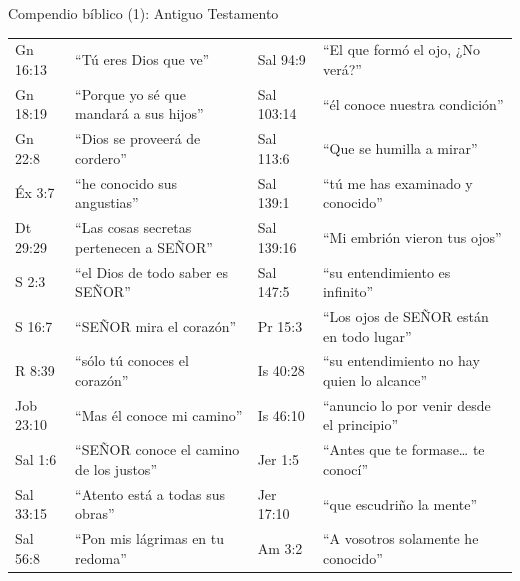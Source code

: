 \documentclass[hyperref={bookmarks=false},aspectratio=169]{beamer}
\newcommand{\SENOR}{S{\fontsize{0.78em}{1em}\selectfont EÑOR}}
\begin{document}
\begin{frame}{Compendio bíblico (1): Antiguo Testamento}
\fontsize{6.2}{7.4}\selectfont\renewcommand{\arraystretch}{1.06}
\begin{tabular}{@{}>{\RaggedRight\arraybackslash}p{1.6cm}>{\RaggedRight\arraybackslash}p{4.3cm}|>{\RaggedRight\arraybackslash}p{1.6cm}>{\RaggedRight\arraybackslash}p{4.3cm}@{}}
\toprule
Gn 16:13 & ``Tú eres Dios que ve'' & Sal 94:9 & ``El que formó el ojo, ¿No verá?'' \\
Gn 18:19 & ``Porque yo sé que mandará a sus hijos'' & Sal 103:14 & ``él conoce nuestra condición'' \\
Gn 22:8 & ``Dios se proveerá de cordero'' & Sal 113:6 & ``Que se humilla a mirar'' \\
Éx 3:7 & ``he conocido sus angustias'' & Sal 139:1 & ``tú me has examinado y conocido'' \\
Dt 29:29 & ``Las cosas secretas pertenecen a \SENOR{}'' & Sal 139:16 & ``Mi embrión vieron tus ojos'' \\
1 S 2:3 & ``el Dios de todo saber es \SENOR{}'' & Sal 147:5 & ``su entendimiento es infinito'' \\
1 S 16:7 & ``\SENOR{} mira el corazón'' & Pr 15:3 & ``Los ojos de \SENOR{} están en todo lugar'' \\
1 R 8:39 & ``sólo tú conoces el corazón'' & Is 40:28 & ``su entendimiento no hay quien lo alcance'' \\
Job 23:10 & ``Mas él conoce mi camino'' & Is 46:10 & ``anuncio lo por venir desde el principio'' \\
Sal 1:6 & ``\SENOR{} conoce el camino de los justos'' & Jer 1:5 & ``Antes que te formase\ldots{} te conocí'' \\
Sal 33:15 & ``Atento está a todas sus obras'' & Jer 17:10 & ``que escudriño la mente'' \\
Sal 56:8 & ``Pon mis lágrimas en tu redoma'' & Am 3:2 & ``A vosotros solamente he conocido'' \\
\bottomrule
\end{tabular}
\end{frame}
\end{document}
